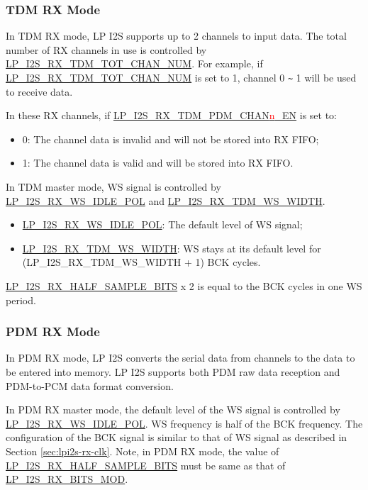 \documentclass[main\_\_EN.tex]{subfiles}
\begin{document}
\subsubsection{TDM RX Mode}

In TDM RX mode, LP I2S supports up to 2 channels to input data. The total number of RX channels in use is controlled by \hyperref[fielddesc:LPI2SRXTDMTOTCHANNUM]{LP\_I2S\_RX\_TDM\_TOT\_CHAN\_NUM}. For example, if \hyperref[fielddesc:LPI2SRXTDMTOTCHANNUM]{LP\_I2S\_RX\_TDM\_TOT\_CHAN\_NUM} is set to 1, channel 0 \verb+~+ 1 will be used to receive data.

In these RX channels, if \hyperref[fielddesc:LPI2SRXTDMPDMCHAN0EN]{LP\_I2S\_RX\_TDM\_PDM\_CHAN{\textcolor{red}{n}}\_EN} is set to:
\begin{itemize}
    \item 0: The channel data is invalid and will not be stored into RX FIFO;
    \item 1: The channel data is valid and will be stored into RX FIFO.
\end{itemize}

In TDM master mode, WS signal is controlled by \hyperref[fielddesc:LPI2SRXWSIDLEPOL]{LP\_I2S\_RX\_WS\_IDLE\_POL} and \hyperref[fielddesc:LPI2SRXTDMWSWIDTH]{LP\_I2S\_RX\_TDM\_WS\_WIDTH}.
\begin{itemize}
    \item \hyperref[fielddesc:LPI2SRXWSIDLEPOL]{LP\_I2S\_RX\_WS\_IDLE\_POL}: The default level of WS signal;
    \item \hyperref[fielddesc:LPI2SRXTDMWSWIDTH]{LP\_I2S\_RX\_TDM\_WS\_WIDTH}: WS stays at its default level for (LP\_I2S\_RX\_TDM\_WS\_WIDTH + 1) BCK cycles.
\end{itemize}

\hyperref[fielddesc:LPI2SRXHALFSAMPLEBITS]{LP\_I2S\_RX\_HALF\_SAMPLE\_BITS} x 2 is equal to the BCK cycles in one WS period.

\subsubsection{PDM RX Mode}

In PDM RX mode, LP I2S converts the serial data from channels to the data to be entered into memory. LP I2S supports both PDM raw data reception and PDM-to-PCM data format conversion.

In PDM RX master mode, the default level of the WS signal is controlled by \hyperref[fielddesc:LPI2SRXWSIDLEPOL]{LP\_I2S\_RX\_WS\_IDLE\_POL}. WS frequency is half of the BCK frequency. The configuration of the BCK signal is similar to that of WS signal as described in Section \ref{sec:lpi2s-rx-clk}. Note, in PDM RX mode, the value of \hyperref[fielddesc:LPI2SRXHALFSAMPLEBITS]{LP\_I2S\_RX\_HALF\_SAMPLE\_BITS} must be same as that of \hyperref[fielddesc:LPI2SRXBITSMOD]{LP\_I2S\_RX\_BITS\_MOD}.
\end{document}
